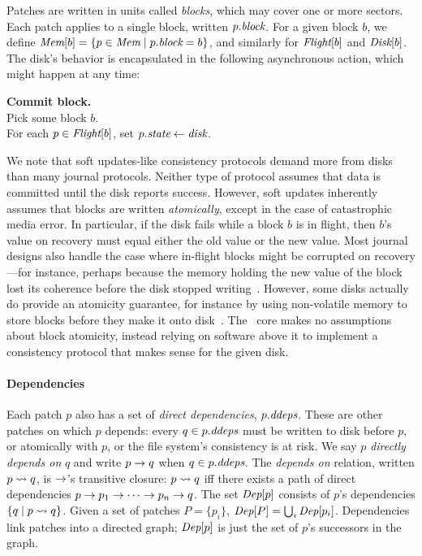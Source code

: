 Patches are written in units called \emph{blocks}, which may cover one or
more sectors.
%
Each patch applies to a single block, written $p.\textit{block}$.
%
For a given block $b$, we define $\PMem[b] = \{p \in \PMem \mid \PBlock{p}
= b \}$, and similarly for $\PInf[b]$ and $\PDisk[b]$.
%
The disk's behavior is encapsulated in the following asynchronous action,
which might happen at any time:

\begin{tabbing}
\quad \textbf{Commit block.} \\
\qquad Pick some block $b$. \\
\qquad For each $p \in \PInf[b]$, set $p.\textit{state} \gets \textit{disk}$.
\end{tabbing}


We note that soft updates-like consistency protocols demand more from disks
than many journal protocols.
%
Neither type of protocol assumes that data is committed until the disk
reports success.
%
However, soft updates inherently assumes that blocks are written
\emph{atomically}, except in the case of catastrophic media error.
%
In particular, if the disk fails while a block $b$ is in flight, then $b$'s
value on recovery must equal either the old value or the new value.
%
Most journal designs also handle the case where in-flight blocks might be
corrupted on recovery---for instance, perhaps because the memory holding
the new value of the block lost its coherence before the disk stopped
writing~\cite{tso}.
%
However, some disks actually do provide an atomicity guarantee, for
instance by using non-volatile memory to store blocks before they make it
onto disk~\cite{???}.
%
The \Kudos\ core makes no assumptions about block atomicity, instead relying
on software above it to implement a consistency protocol that makes sense
for the given disk.


\paragraph{Dependencies}
%
Each patch $p$ also has a set of \emph{direct dependencies}, $\PDDepset{p}$.
%
These are other patches on which $p$ depends: every $q \in \PDDepset{p}$
must be written to disk before $p$, or atomically with $p$, or the file
system's consistency is at risk.
%
We say $p$ \emph{directly depends on} $q$ and write $p \rightarrow q$ when $q
\in \PDDepset{p}$.
%
The \emph{depends on} relation, written $p \leadsto q$, is $\rightarrow$'s
transitive closure: $p \leadsto q$ iff there exists a path of direct
dependencies $p \rightarrow p_1 \rightarrow \cdots \rightarrow p_n \rightarrow q$.
%
The set $\textit{Dep}[p]$ consists of $p$'s dependencies $\{q \mid p \leadsto
q \}$.
%
Given a set of patches $P = \{p_i\}$, $\textit{Dep}[P] = \bigcup_i
\textit{Dep}[p_i]$.
%
Dependencies link patches into a directed graph; $\textit{Dep}[p]$ is just the
set of $p$'s successors in the graph.


